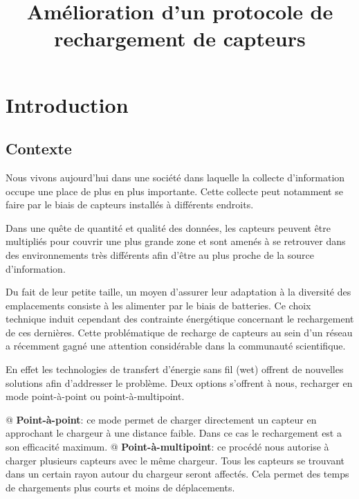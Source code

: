 \documentclass[noposter,final]{polytech/polytech}
\title{Amélioration d'un protocole de rechargement de capteurs}
\begin{document}
\chapter{Introduction}
	\section{Contexte}
		Nous vivons aujourd'hui dans une société dans laquelle la collecte d'information occupe une place de plus en plus importante.
		Cette collecte peut notamment se faire par le biais de capteurs installés à différents endroits.
		
		
		Dans une quête de quantité et qualité des données, les capteurs peuvent être multipliés pour couvrir une plus grande zone et sont amenés à se retrouver dans des environnements très différents afin d'être au plus proche de la source d'information.
		
		Du fait de leur petite taille, un moyen d'assurer leur adaptation à la diversité des emplacements consiste à les alimenter par le biais de batteries.
		Ce choix technique induit cependant des contrainte énergétique concernant le rechargement de ces dernières.
		Cette problématique de recharge de capteurs au sein d'un réseau a récemment gagné une attention considérable dans la communauté scientifique.
		
		En effet les technologies de transfert d'énergie sans fil (\gls{wet}) offrent de nouvelles solutions afin d'addresser le problème.
		Deux options s'offrent à nous, recharger en mode point-à-point ou point-à-multipoint.
		\begin{easylist}[itemize]
			@ \textbf{Point-à-point}: ce mode permet de charger directement un capteur en approchant le chargeur à une distance faible.
			Dans ce cas le rechargement est a son efficacité maximum.
			@ \textbf{Point-à-multipoint}: ce procédé nous autorise à charger plusieurs capteurs avec le même chargeur.
			Tous les capteurs se trouvant dans un certain rayon autour du chargeur seront affectés.
			Cela permet des temps de chargements plus courts et moins de déplacements.
		\end{easylist}
	
\end{document}
